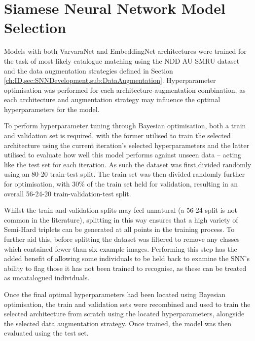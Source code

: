 \section{Siamese Neural Network Model Selection}\label{ch:ID,sec:ModelSelection}

Models with both VarvaraNet and EmbeddingNet architectures were trained for the task of most likely catalogue matching using the NDD AU SMRU dataset and the data augmentation strategies defined in Section \ref{ch:ID,sec:SNNDevelopment,sub:DataAugmentation}. Hyperparameter optimisation was performed for each architecture-augmentation combination, as each architecture and augmentation strategy may influence the optimal hyperparameters for the model.

To perform hyperparameter tuning through Bayesian optimisation, both a train and validation set is required, with the former utilised to train the selected architecture using the current iteration's selected hyperparameters and the latter utilised to evaluate how well this model performs against unseen data -- acting like the test set for each iteration. As such the dataset was first divided randomly using an 80-20 train-test split. The train set was then divided randomly further for optimisation, with 30\% of the train set held for validation, resulting in an overall 56-24-20 train-validation-test split.

Whilst the train and validation splits may feel unnatural (a 56-24 split is not common in the literature), splitting in this way ensures that a high variety of Semi-Hard triplets can be generated at all points in the training process. To further aid this, before splitting the dataset was filtered to remove any classes which contained fewer than six example images. Performing this step has the added benefit of allowing some individuals to be held back to examine the SNN's ability to flag those it has not been trained to recognise, as these can be treated as uncatalogued individuals. 

Once the final optimal hyperparameters had been located using Bayesian optimisation, the train and validation sets were recombined and used to train the selected architecture from scratch using the located hyperparameters, alongside the selected data augmentation strategy. Once trained, the model was then evaluated using the test set. 

